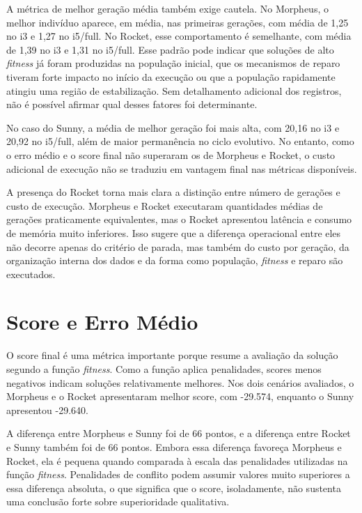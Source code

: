 A métrica de melhor geração média também exige cautela. No Morpheus, o melhor indivíduo aparece, em média, nas primeiras gerações, com média de 1,25 no i3 e 1,27 no i5/full. No Rocket, esse comportamento é semelhante, com média de 1,39 no i3 e 1,31 no i5/full. Esse padrão pode indicar que soluções de alto \textit{fitness} já foram produzidas na população inicial, que os mecanismos de reparo tiveram forte impacto no início da execução ou que a população rapidamente atingiu uma região de estabilização. Sem detalhamento adicional dos registros, não é possível afirmar qual desses fatores foi determinante.

No caso do Sunny, a média de melhor geração foi mais alta, com 20,16 no i3 e 20,92 no i5/full, além de maior permanência no ciclo evolutivo. No entanto, como o erro médio e o score final não superaram os de Morpheus e Rocket, o custo adicional de execução não se traduziu em vantagem final nas métricas disponíveis.

A presença do Rocket torna mais clara a distinção entre número de gerações e custo de execução. Morpheus e Rocket executaram quantidades médias de gerações praticamente equivalentes, mas o Rocket apresentou latência e consumo de memória muito inferiores. Isso sugere que a diferença operacional entre eles não decorre apenas do critério de parada, mas também do custo por geração, da organização interna dos dados e da forma como população, \textit{fitness} e reparo são executados.

\section{Score e Erro Médio}
\label{sec:score-erro-medio}

O score final é uma métrica importante porque resume a avaliação da solução segundo a função \textit{fitness}. Como a função aplica penalidades, scores menos negativos indicam soluções relativamente melhores. Nos dois cenários avaliados, o Morpheus e o Rocket apresentaram melhor score, com -29.574, enquanto o Sunny apresentou -29.640.

A diferença entre Morpheus e Sunny foi de 66 pontos, e a diferença entre Rocket e Sunny também foi de 66 pontos. Embora essa diferença favoreça Morpheus e Rocket, ela é pequena quando comparada à escala das penalidades utilizadas na função \textit{fitness}. Penalidades de conflito podem assumir valores muito superiores a essa diferença absoluta, o que significa que o score, isoladamente, não sustenta uma conclusão forte sobre superioridade qualitativa.

